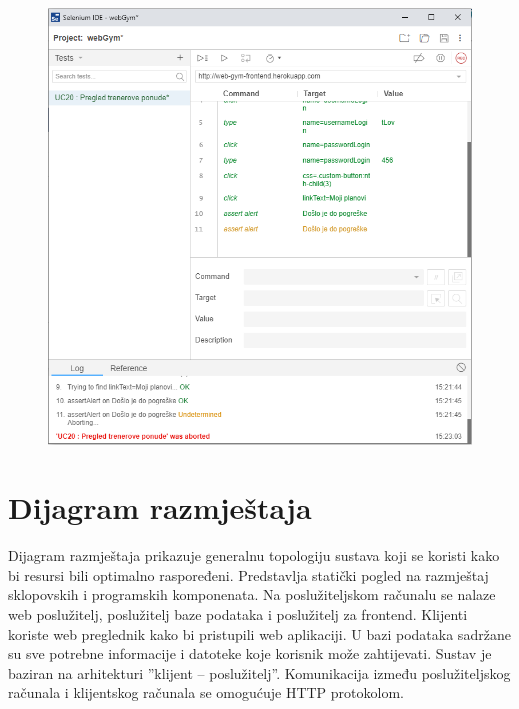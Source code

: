 					\begin{figure}[H]
        			\hspace*{-1.5cm}
        			\includegraphics[scale=0.5]{slike/error.PNG} %
        			\centering
        			\label{fig:promjene}
	        	\end{figure}
		 
			\eject 
			
			
		\section{Dijagram razmještaja}
		
		Dijagram razmještaja prikazuje generalnu topologiju sustava koji se koristi kako bi resursi bili optimalno raspoređeni. Predstavlja statički pogled na razmještaj sklopovskih i programskih komponenata. Na poslužiteljskom računalu se nalaze web poslužitelj, poslužitelj baze podataka i poslužitelj za frontend. Klijenti koriste web preglednik kako bi pristupili web aplikaciji. U bazi podataka sadržane su sve potrebne informacije i datoteke koje korisnik može zahtijevati. Sustav je baziran na arhitekturi ”klijent – poslužitelj”. Komunikacija između poslužiteljskog računala i klijentskog računala se omogućuje HTTP protokolom. 
		
